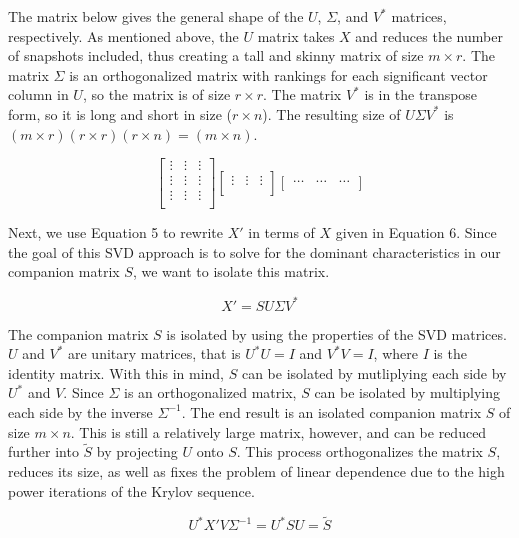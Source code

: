 \documentclass[%
 aip,
 amsmath,amssymb,
 reprint,%
 floatfix,%
]{revtex4-1}
\begin{document}
The matrix below gives the general shape of the $U$, $\Sigma$, and $V^*$ matrices, respectively. As mentioned above, the $U$ matrix takes $X$ and reduces the number of snapshots included, thus creating a tall and skinny matrix of size $m \times r$. The matrix $\Sigma$ is an orthogonalized matrix with rankings for each significant vector column in $U$, so the matrix is of size $r \times r$. The matrix $V^*$ is in the transpose form, so it is long and short in size ($r \times n$). The resulting size of $U \Sigma V^*$ is $(m \times r)(r \times r)(r \times n) = (m \times n)$.

$$
\begin{bmatrix}
	\vdots & \vdots & \vdots  \\
	\vdots & \vdots & \vdots  \\
	\vdots & \vdots & \vdots  \\
\end{bmatrix}
\begin{bmatrix}
	\vdots & \vdots & \vdots  \\
\end{bmatrix}
\begin{bmatrix}
	\hdots & \hdots & \hdots  \\
\end{bmatrix}
$$

Next, we use Equation 5 to rewrite $X'$ in terms of $X$ given in Equation 6. Since the goal of this SVD approach is to solve for the dominant characteristics in our companion matrix $S$, we want to isolate this matrix.

\begin{equation}
	X' = S U \Sigma V^*
\end{equation}

The companion matrix $S$ is isolated by using the properties of the SVD matrices. $U$ and $V^*$ are unitary matrices, that is $U^*U=I$ and $V^*V=I$, where $I$ is the identity matrix. With this in mind, $S$ can be isolated by mutliplying each side by $U^*$ and $V$. Since $\Sigma$ is an orthogonalized matrix, $S$ can be isolated by multiplying each side by the inverse $\Sigma^{-1}$. The end result is an isolated companion matrix $S$ of size $m \times n$. This is still a relatively large matrix, however, and can be reduced further into $\tilde S$ by projecting $U$ onto $S$. This process orthogonalizes the matrix $S$, reduces its size, as well as fixes the problem of linear dependence due to the high power iterations of the Krylov sequence.

\begin{equation}
	U^* X' V \Sigma^{-1} = U^* S U = \tilde S
\end{equation}
		
\end{document}
